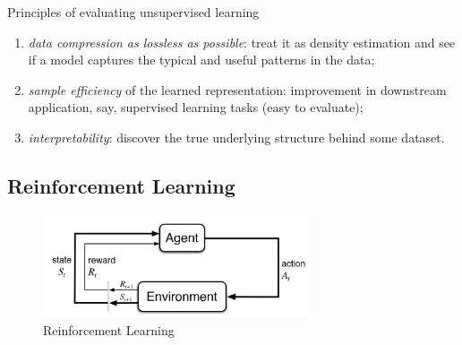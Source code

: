 Principles of evaluating unsupervised learning
\begin{enumerate}
    \item \textit{data compression as lossless as possible}:
    treat it as density estimation
    and see if a model captures the typical and useful patterns in the data;
    \item \textit{sample efficiency} of the learned representation: improvement in downstream application, 
    say, supervised learning tasks (easy to evaluate);
    \item \textit{interpretability}: discover the true underlying structure behind some dataset.
\end{enumerate}

\subsection{Reinforcement Learning}
\begin{figure}[htpb]
    \centering
    \includegraphics[width=0.7\textwidth]{figs/rl.png}
    \caption{Reinforcement Learning\protect\footnotemark[1]}
    \label{fig:rldiag}
\end{figure}


